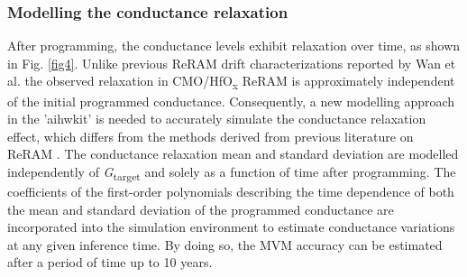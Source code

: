 \subsubsection{Modelling the conductance relaxation}
After programming, the conductance levels exhibit relaxation over time, as shown in Fig. \ref{fig4}. Unlike previous ReRAM drift characterizations reported by Wan et al. \cite{Wan2022} the observed relaxation in CMO/HfO\textsubscript{\textnormal{x}} ReRAM is approximately independent of the initial programmed conductance. Consequently, a new modelling approach in the 'aihwkit' is needed to accurately simulate the conductance relaxation effect, which differs from the methods derived from previous literature on ReRAM \cite{Wan2022}. The conductance relaxation mean and standard deviation are modelled independently of \textit{G}\textsubscript{\textnormal{target}} and solely as a function of time after programming. 
The coefficients of the first-order polynomials describing the time dependence of both the mean and standard deviation of the programmed conductance are incorporated into the simulation environment to estimate conductance variations at any given inference time. By doing so, the MVM accuracy can be estimated after a period of time up to 10 years.
